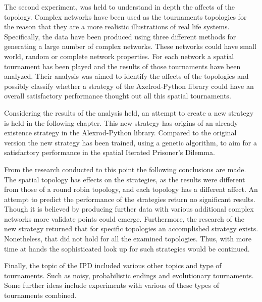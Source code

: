 The second experiment, was held to understand in depth the affects of the
topology. Complex networks have been used as the tournaments topologies for the
reason that they are a more realistic illustrations of real life systems.
Specifically, the data have been produced using three different methods for
generating a large number of complex networks. These networks could have small world,
random or complete network properties. For each network a spatial tournament has
been played and the results of those tournaments have been analyzed. Their analysis
was aimed to identify the affects of the topologies and possibly classify whether
a strategy of the Axelrod-Python library could have an overall satisfactory performance
thought out all this spatial tournaments.

Considering the results of the analysis held, an attempt to create a new strategy
is held in the following chapter. This new strategy has origins of an already existence
strategy in the Alexrod-Python library. Compared to the original version the new
strategy has been trained, using a genetic algorithm, to aim for a satisfactory
performance in the spatial Iterated Prisoner's Dilemma.

From the research conducted to this point the following conclusions are made.
The spatial topology has effects on the strategies, as the results were different
from those of a round robin topology, and each topology has a different affect. An attempt
to predict the performance of the strategies return no significant results. Though
it is believed by producing further data with various additional complex networks
more validate points could emerge. Furthermore, the research of the new strategy
returned that for specific topologies an accomplished strategy exists.
Nonetheless, that did not hold for all the examined topologies. Thus,
with more time at hands the sophisticated look up for such strategies would be
continued.

Finally, the topic of the IPD included various other topics and type of tournaments.
Such as noisy, probabilistic endings and evolutionary tournaments. Some further
ideas include experiments with various of these types of tournaments combined.
